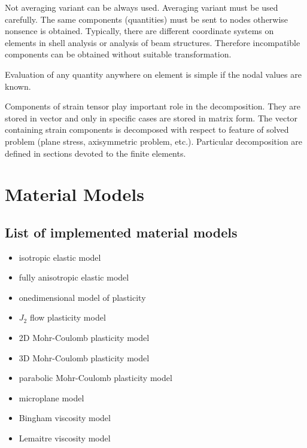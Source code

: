 Not averaging variant can be always used. Averaging variant must be used carefully. The same components (quantities)
must be sent to nodes otherwise nonsence is obtained. Typically, there are different coordinate systems on elements
in shell analysis or analysis of beam structures. Therefore incompatible components can be obtained without
suitable transformation.


Evaluation of any quantity anywhere on element is simple if the nodal values are known.

Components of strain tensor play important role in the decomposition. They are stored in vector and only in specific
cases are stored in matrix form. The vector containing strain components is decomposed with respect to feature of
solved problem (plane stress, axisymmetric problem, etc.). Particular decomposition are defined in sections devoted
to the finite elements.


\chapter{Material Models}
\section{List of implemented material models}
\begin{itemize}
\item{isotropic elastic model}
\item{fully anisotropic elastic model}
\item{onedimensional model of plasticity}
\item{$J_2$ flow plasticity model}
\item{2D Mohr-Coulomb plasticity model}
\item{3D Mohr-Coulomb plasticity model}
\item{parabolic Mohr-Coulomb plasticity model}
\item{microplane model}
\item{Bingham viscosity model}
\item{Lemaitre viscosity model}
\end{itemize}

